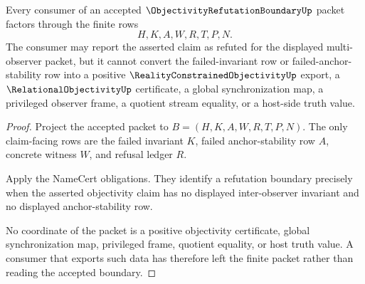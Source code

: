 \begin{theorem}
\label{thm:objectivity-refutation-boundary-nonescape}
Every consumer of an accepted $\ObjectivityRefutationBoundaryUp$ packet factors through the finite rows
$$
H,K,A,W,R,T,P,N.
$$
The consumer may report the asserted claim as refuted for the displayed multi-observer packet, but it cannot convert the failed-invariant row or failed-anchor-stability row into a positive $\RealityConstrainedObjectivityUp$ export, a $\RelationalObjectivityUp$ certificate, a global synchronization map, a privileged observer frame, a quotient stream equality, or a host-side truth value.
\end{theorem}
\begin{proof}
Project the accepted packet to $B=(H,K,A,W,R,T,P,N)$. The only claim-facing rows are the failed invariant $K$, failed anchor-stability row $A$, concrete witness $W$, and refusal ledger $R$.

Apply the NameCert obligations. They identify a refutation boundary precisely when the asserted objectivity claim has no displayed inter-observer invariant and no displayed anchor-stability row.

No coordinate of the packet is a positive objectivity certificate, global synchronization map, privileged frame, quotient equality, or host truth value. A consumer that exports such data has therefore left the finite packet rather than reading the accepted boundary.
\end{proof}

